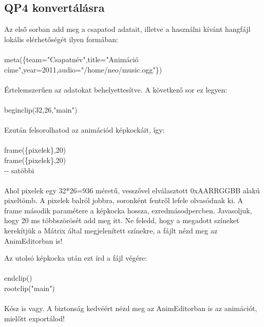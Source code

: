 \documentclass[a4paper,12pt,release]{article}
\begin{document}
\subsection{QP4 konvertálásra}
Az első sorban add meg a csapatod adatait, illetve a használni kívánt hangfájl lokális elérhetőségét ilyen formában:
\\\\
meta(\{team="Csapatnév",title="Animáció címe",year=2011,audio="/home/neo/music.ogg"\})
\\\\
Értelemszerűen az adatokat behelyettesítve.
A következő sor ez legyen:
\\\\
beginclip(32,26,"main")
\\\\
Ezután felsorolhatod az animációd képkockáit, így:
\\\\
frame(\{pixelek\},20)\\
frame(\{pixelek\},20)\\
-{}- satöbbi
\\\\
Ahol pixelek egy 32*26=936 méretű, vesszővel elválasztott 0xAARRGGBB alakú pixeltömb. A pixelek balról jobbra, soronként fentről lefele olvasódnak ki. A frame második paramétere a képkocka hossza, ezredmásodpercben. Javasoljuk, hogy 20 ms többszörösét add meg itt. Ne feledd, hogy a megadott színeket kerekítjük a Mátrix által megjelenített színekre, a fájlt nézd meg az AnimEditorban is!

Az utolsó képkocka után ezt írd a fájl végére:
\\\\
endclip()\\
rootclip("main")
\\\\
Kész is vagy. A biztonság kedvéért nézd meg az AnimEditorban is az animációt, mielőtt exportálod!
\clearpage
\end{document}

